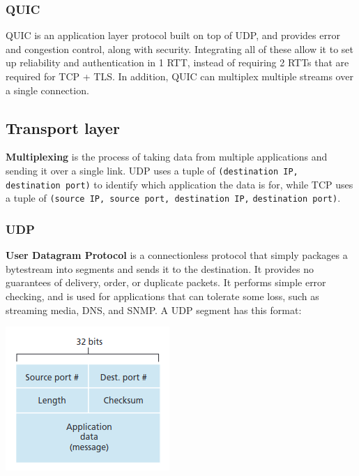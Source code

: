 \subsubsection{QUIC}
QUIC is an application layer protocol built on top of UDP, and provides error and congestion control, along with security. Integrating all of these allow it to set up reliability and authentication in 1 RTT, instead of requiring 2 RTTs that are required for TCP + TLS. In addition, QUIC can multiplex multiple streams over a single connection.

\subsection{Transport layer}
\textbf{Multiplexing} is the process of taking data from multiple applications and sending it over a single link. UDP uses a tuple of \verb|(destination IP, destination port)| to identify which application the data is for, while TCP uses a tuple of \verb|(source IP, source port, destination IP,| \verb|destination port)|.

\subsubsection{UDP}
\textbf{User Datagram Protocol} is a connectionless protocol that simply packages a bytestream into segments and sends it to the destination. It provides no guarantees of delivery, order, or duplicate packets. It performs simple error checking, and is used for applications that can tolerate some loss, such as streaming media, DNS, and SNMP. A UDP segment has this format:\\
\begin{center}
	\includegraphics[width=0.7\linewidth]{../images/w4n3udpSegment.png}\\
\end{center}

